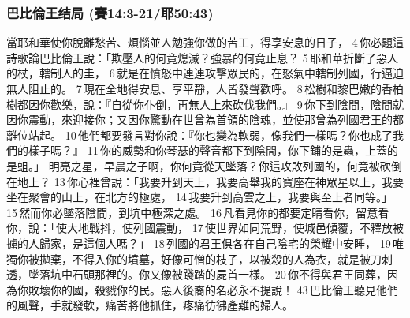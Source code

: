 \subsubsection{巴比倫王结局 (賽14:3-21/耶50:43)}
當耶和華使你脫離愁苦、煩惱並人勉強你做的苦工，得享安息的日子， 4 你必題這詩歌論巴比倫王說：「欺壓人的何竟熄滅？強暴的何竟止息？ 5 耶和華折斷了惡人的杖，轄制人的圭， 6 就是在憤怒中連連攻擊眾民的，在怒氣中轄制列國，行逼迫無人阻止的。 7 現在全地得安息、享平靜，人皆發聲歡呼。 8 松樹和黎巴嫩的香柏樹都因你歡樂，說：『自從你仆倒，再無人上來砍伐我們。』 9 你下到陰間，陰間就因你震動，來迎接你；又因你驚動在世曾為首領的陰魂，並使那曾為列國君王的都離位站起。 10 他們都要發言對你說：『你也變為軟弱，像我們一樣嗎？你也成了我們的樣子嗎？』 11 你的威勢和你琴瑟的聲音都下到陰間，你下鋪的是蟲，上蓋的是蛆。」
明亮之星，早晨之子啊，你何竟從天墜落？你這攻敗列國的，何竟被砍倒在地上？ 13 你心裡曾說：「我要升到天上，我要高舉我的寶座在神眾星以上，我要坐在聚會的山上，在北方的極處， 14 我要升到高雲之上，我要與至上者同等。」 15 然而你必墜落陰間，到坑中極深之處。 16 凡看見你的都要定睛看你，留意看你，說：「使大地戰抖，使列國震動， 17 使世界如同荒野，使城邑傾覆，不釋放被擄的人歸家，是這個人嗎？」 18 列國的君王俱各在自己陰宅的榮耀中安睡， 19 唯獨你被拋棄，不得入你的墳墓，好像可憎的枝子，以被殺的人為衣，就是被刀刺透，墜落坑中石頭那裡的。你又像被踐踏的屍首一樣。 20 你不得與君王同葬，因為你敗壞你的國，殺戮你的民。惡人後裔的名必永不提說！
43 巴比倫王聽見他們的風聲，手就發軟，痛苦將他抓住，疼痛彷彿產難的婦人。



